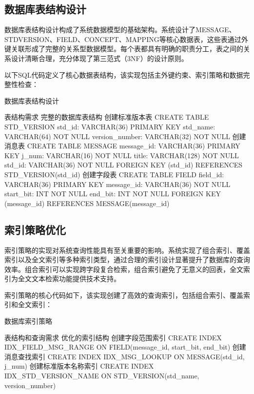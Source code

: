 \subsection{数据库表结构设计}

数据库表结构设计构成了系统数据模型的基础架构。系统设计了MESSAGE、STDVERSION、FIELD、CONCEPT、MAPPING等核心数据表，这些表通过外键关联形成了完整的关系型数据模型。每个表都具有明确的职责分工，表之间的关系设计清晰合理，充分体现了第三范式（3NF）的设计原则。

以下SQL代码定义了核心数据表结构，该实现包括主外键约束、索引策略和数据完整性检查：

\begin{algorithm}[H]
\caption{数据库表结构设计}
\begin{algorithmic}[1]
\REQUIRE 表结构需求
\ENSURE 完整的数据库表结构
\STATE 创建标准版本表
\STATE CREATE TABLE STD\_VERSION
\STATE std\_id: VARCHAR(36) PRIMARY KEY
\STATE std\_name: VARCHAR(64) NOT NULL
\STATE version\_number: VARCHAR(32) NOT NULL
\STATE 创建消息表
\STATE CREATE TABLE MESSAGE
\STATE message\_id: VARCHAR(36) PRIMARY KEY
\STATE j\_num: VARCHAR(16) NOT NULL
\STATE title: VARCHAR(128) NOT NULL
\STATE std\_id: VARCHAR(36) NOT NULL
\STATE FOREIGN KEY (std\_id) REFERENCES STD\_VERSION(std\_id)
\STATE 创建字段表
\STATE CREATE TABLE FIELD
\STATE field\_id: VARCHAR(36) PRIMARY KEY
\STATE message\_id: VARCHAR(36) NOT NULL
\STATE start\_bit: INT NOT NULL
\STATE end\_bit: INT NOT NULL
\STATE FOREIGN KEY (message\_id) REFERENCES MESSAGE(message\_id)
\end{algorithmic}
\end{algorithm}

\subsection{索引策略优化}

索引策略的实现对系统查询性能具有至关重要的影响。系统实现了组合索引、覆盖索引以及全文索引等多种索引类型，通过合理的索引设计显著提升了数据库的查询效率。组合索引可以实现跨字段复合检索，组合索引避免了无意义的回表，全文索引为全文文本检索功能提供技术支持。

索引策略的核心代码如下，该实现创建了高效的查询索引，包括组合索引、覆盖索引和全文索引：

\begin{algorithm}[H]
\caption{数据库索引策略}
\begin{algorithmic}[1]
\REQUIRE 表结构和查询需求
\ENSURE 优化的索引结构
\STATE 创建字段范围索引
\STATE CREATE INDEX IDX\_FIELD\_MSG\_RANGE ON FIELD(message\_id, start\_bit, end\_bit)
\STATE 创建消息查找索引
\STATE CREATE INDEX IDX\_MSG\_LOOKUP ON MESSAGE(std\_id, j\_num)
\STATE 创建标准版本名称索引
\STATE CREATE INDEX IDX\_STD\_VERSION\_NAME ON STD\_VERSION(std\_name, version\_number)
\end{algorithmic}
\end{algorithm}

